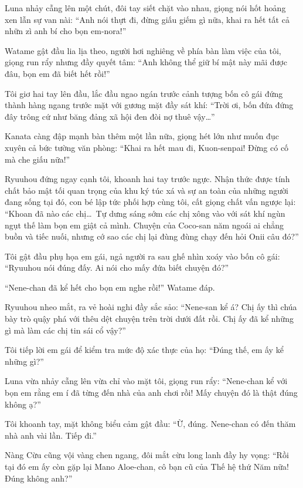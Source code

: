 \documentclass[../main.tex]{subfiles}
\begin{document}
Luna nhảy cẫng lên một chút, đôi tay siết chặt vào nhau, giọng nói hốt hoảng xen lẫn sự van nài: ``Anh nói thựt đi, đừng giấu giếm gì nữa, khai ra hết tất cả nhữn zì anh bí cho bọn em-nora!''

Watame gật đầu lia lịa theo, người hơi nghiêng về phía bàn làm việc của tôi, giọng run rẩy nhưng đầy quyết tâm: ``Anh không thể giữ bí mật này mãi được đâu, bọn em đã biết hết rồi!''

Tôi giơ hai tay lên đầu, lắc đầu ngao ngán trước cảnh tượng bốn cô gái đứng thành hàng ngang trước mặt với gương mặt đầy sát khí: ``Trời ơi, bốn đứa đứng đây trông cứ như băng đảng xã hội đen đòi nợ thuê vậy\dots''

Kanata càng đập mạnh bàn thêm một lần nữa, giọng hét lớn như muốn đục xuyên cả bức tường văn phòng: ``Khai ra hết mau đi, Kuon-senpai! Đừng có cố mà che giấu nữa!''

Ryuuhou đứng ngay cạnh tôi, khoanh hai tay trước ngực. Nhận thức được tính chất bảo mật tối quan trọng của khu ký túc xá và sự an toàn của những người đang sống tại đó, con bé lập tức phối hợp cùng tôi, cất giọng chất vấn ngược lại: ``Khoan đã nào các chị\dots\ Tự dưng sáng sớm các chị xông vào với sát khí ngùn ngụt thế làm bọn em giật cả mình. Chuyện của Coco-san năm ngoái ai chẳng buồn và tiếc nuối, nhưng cớ sao các chị lại đùng đùng chạy đến hỏi Onii câu đó?''

Tôi gật đầu phụ họa em gái, ngả người ra sau ghế nhìn xoáy vào bốn cô gái: ``Ryuuhou nói đúng đấy. Ai nói cho mấy đứa biết chuyện đó?''

``Nene-chan đã kể hết cho bọn em nghe rồi!'' Watame đáp.

Ryuuhou nheo mắt, ra vẻ hoài nghi đầy sắc sảo: ``Nene-san kể á? Chị ấy thì chúa bày trò quậy phá với thêu dệt chuyện trên trời dưới đất rồi. Chị ấy đã kể những gì mà làm các chị tin sái cổ vậy?''

Tôi tiếp lời em gái để kiểm tra mức độ xác thực của họ: ``Đúng thế, em ấy kể những gì?''

Luna vừa nhảy cẫng lên vừa chỉ vào mặt tôi, giọng run rẩy: ``Nene-chan kể với bọn em rằng em í đã từng đến nhà của anh chơi rồi! Mấy chuyện đó là thật đúng không ạ?''

Tôi khoanh tay, mặt không biểu cảm gật đầu: ``Ừ, đúng. Nene-chan có đến thăm nhà anh vài lần. Tiếp đi.''

Nàng Cừu cũng vội vàng chen ngang, đôi mắt cừu long lanh đầy hy vọng: ``Rồi tại đó em ấy còn gặp lại Mano Aloe-chan, cô bạn cũ của Thế hệ thứ Năm nữa! Đúng không anh?''
\end{document}
